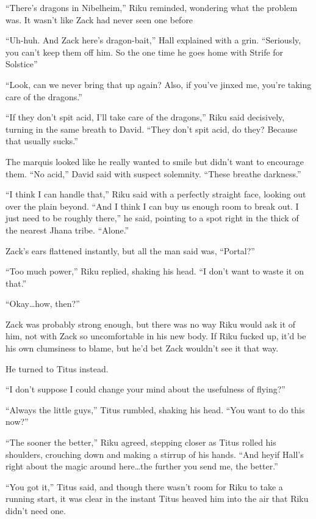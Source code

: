 ``There's dragons in Nibelheim,'' Riku reminded, wondering what the problem was. It wasn't like Zack had never seen one before\textemdash 

``Uh-huh. And Zack here's dragon-bait,'' Hall explained with a grin. ``Seriously, you can't keep them off him. So the one time he goes home with Strife for Solstice\textemdash''

``Look, can we never bring that up again? Also, if you've jinxed me, you're taking care of the dragons.''

``If they don't spit acid, I'll take care of the dragons,'' Riku said decisively, turning in the same breath to David. ``They don't spit acid, do they? Because that usually sucks.''

The marquis looked like he really wanted to smile but didn't want to encourage them. ``No acid,'' David said with suspect solemnity. ``These breathe darkness.''

``I think I can handle that,'' Riku said with a perfectly straight face, looking out over the plain beyond. ``And I think I can buy us enough room to break out. I just need to be roughly there,'' he said, pointing to a spot right in the thick of the nearest Jhana tribe. ``Alone.''

Zack's ears flattened instantly, but all the man said was, ``Portal?''

``Too much power,'' Riku replied, shaking his head. ``I don't want to waste it on that.''

``Okay\ldots how, then?''

Zack was probably strong enough, but there was no way Riku would ask it of him, not with Zack so uncomfortable in his new body. If Riku fucked up, it'd be his own clumsiness to blame, but he'd bet Zack wouldn't see it that way.

He turned to Titus instead.

``I don't suppose I could change your mind about the usefulness of flying?''

``Always the little guys,'' Titus rumbled, shaking his head. ``You want to do this now?''

``The sooner the better,'' Riku agreed, stepping closer as Titus rolled his shoulders, crouching down and making a stirrup of his hands. ``And hey\textemdash if Hall's right about the magic around here\ldots the further you send me, the better.''

``You got it,'' Titus said, and though there wasn't room for Riku to take a running start, it was clear in the instant Titus heaved him into the air that Riku didn't need one.

